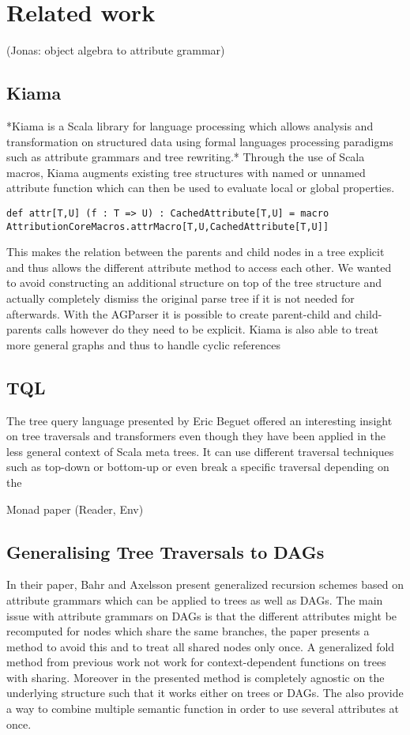 \section{Related work}
(Jonas: object algebra to attribute grammar)
\subsection{Kiama}
*Kiama is a Scala library for language processing which allows analysis and transformation on structured data using formal languages processing paradigms such as attribute grammars and tree rewriting.*
Through the use of Scala macros, Kiama augments existing tree structures with named or unnamed attribute function which can then be used to evaluate local or global properties.
\begin{verbatim}def attr[T,U] (f : T => U) : CachedAttribute[T,U] = macro AttributionCoreMacros.attrMacro[T,U,CachedAttribute[T,U]]\end{verbatim}
This makes the relation between the parents and child nodes in a tree explicit and thus allows the different attribute method to access each other. We wanted to avoid constructing an additional structure on top of the tree structure and actually completely dismiss the original parse tree if it is not needed for afterwards. With the AGParser it is possible to create parent-child and child-parents calls however do they need to be explicit.
Kiama is also able to treat more general graphs and thus to handle cyclic references

\subsection{TQL}
The tree query language presented by Eric Beguet offered an interesting insight on tree traversals and transformers even though they have been applied in the less general context of Scala meta trees. It can use different traversal techniques such as top-down or bottom-up or even break a specific traversal depending on the 

Monad paper (Reader, Env)

\subsection{Generalising Tree Traversals to DAGs}
In their paper, Bahr and Axelsson present generalized recursion schemes based on attribute grammars which can be applied to trees as well as DAGs. The main issue with attribute grammars on DAGs is that the different attributes might be recomputed for nodes which share the same branches, the paper presents a method to avoid this and to treat all shared nodes only once. A generalized fold method from previous work not work for context-dependent functions on trees with sharing. Moreover in the presented method is completely agnostic on the underlying structure such that it works either on trees or DAGs.
The also provide a way to combine multiple semantic function in order to use several attributes at once.

